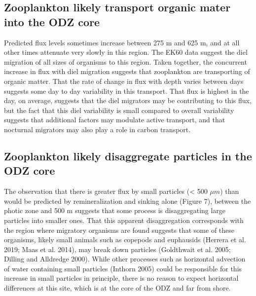 \documentclass[]{article}
\begin{document}
\hypertarget{zooplankton-likely-transport-organic-mater-into-the-odz-core}{%
\subsection{Zooplankton likely transport organic mater into the ODZ
core}\label{zooplankton-likely-transport-organic-mater-into-the-odz-core}}

Predicted flux levels sometimes increase between 275 m and 625 m, and at
all other times attenuate very slowly in this region. The EK60 data
suggest the diel migration of all sizes of organisms to this region.
Taken together, the concurrent increase in flux with diel migration
suggests that zooplankton are transporting of organic matter. That the
rate of change in flux with depth varies between days suggests some day
to day variability in this transport. That flux is highest in the day,
on average, suggests that the diel migrators may be contributing to this
flux, but the fact that this diel variability is small compared to
overall variability suggests that additional factors may modulate active
transport, and that nocturnal migrators may also play a role in carbon
transport.

\hypertarget{zooplankton-likely-disaggregate-particles-in-the-odz-core}{%
\subsection{Zooplankton likely disaggregate particles in the ODZ
core}\label{zooplankton-likely-disaggregate-particles-in-the-odz-core}}

The observation that there is greater flux by small particles
(\textless{} 500 \(\mu m\)) than would be predicted by remineralization
and sinking alone (Figure 7), between the photic zone and 500 m suggests
that some process is disaggregating large particles into smaller ones.
That this apparent disaggregation corresponds with the region where
migratory organisms are found suggests that some of these organisms,
likely small animals such as copepods and euphausids (Herrera et al.
2019; Maas et al. 2014), may break down particles (Goldthwait et al.
2005; Dilling and Alldredge 2000). While other processes such as
horizontal advection of water containing small particles (Inthorn 2005)
could be responsible for this increase in small particles in principle,
there is no reason to expect horizontal differences at this site, which
is at the core of the ODZ and far from shore.
\end{document}
